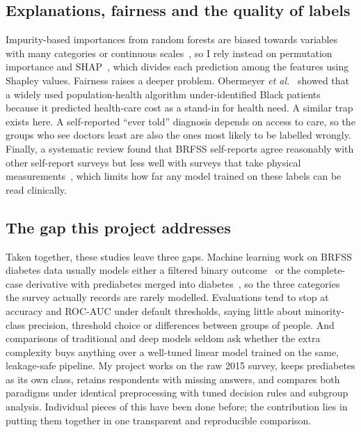 \subsection{Explanations, fairness and the quality of labels}
Impurity-based importances from random forests are biased towards variables with many categories or continuous scales~\cite{strobl2007}, so I rely instead on permutation importance and SHAP~\cite{lundberg2017}, which divides each prediction among the features using Shapley values. Fairness raises a deeper problem. Obermeyer \emph{et al.}~\cite{obermeyer2019} showed that a widely used population-health algorithm under-identified Black patients because it predicted health-care cost as a stand-in for health need. A similar trap exists here. A self-reported ``ever told'' diagnosis depends on access to care, so the groups who see doctors least are also the ones most likely to be labelled wrongly. Finally, a systematic review found that BRFSS self-reports agree reasonably with other self-report surveys but less well with surveys that take physical measurements~\cite{pierannunzi2013}, which limits how far any model trained on these labels can be read clinically.

\subsection{The gap this project addresses}
Taken together, these studies leave three gaps. Machine learning work on BRFSS diabetes data usually models either a filtered binary outcome~\cite{xie2019} or the complete-case derivative with prediabetes merged into diabetes~\cite{majcherek2025,zafar2025}, so the three categories the survey actually records are rarely modelled. Evaluations tend to stop at accuracy and ROC-AUC under default thresholds, saying little about minority-class precision, threshold choice or differences between groups of people. And comparisons of traditional and deep models seldom ask whether the extra complexity buys anything over a well-tuned linear model trained on the same, leakage-safe pipeline. My project works on the raw 2015 survey, keeps prediabetes as its own class, retains respondents with missing answers, and compares both paradigms under identical preprocessing with tuned decision rules and subgroup analysis. Individual pieces of this have been done before; the contribution lies in putting them together in one transparent and reproducible comparison.
